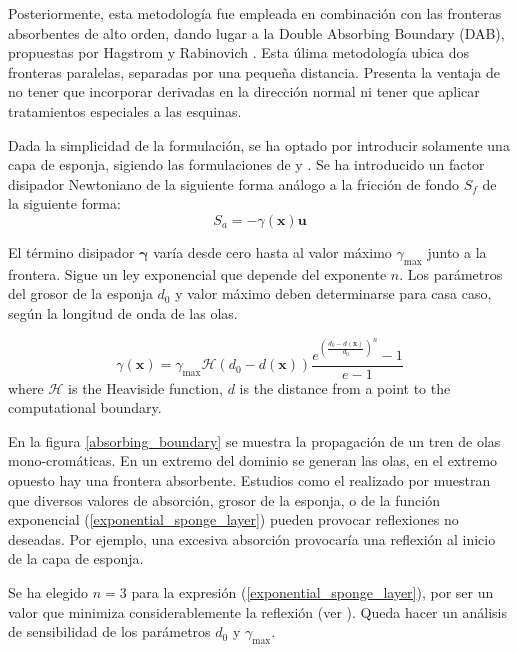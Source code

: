 Posteriormente, esta metodología fue empleada en combinación con las fronteras absorbentes de alto orden, dando lugar a la Double Absorbing Boundary (DAB), propuestas por Hagstrom y Rabinovich \cite{hagstrom2014,rabinovich2015}. Esta úlima metodología ubica dos fronteras paralelas, separadas por una pequeña distancia. Presenta la ventaja de no tener que incorporar derivadas en la dirección normal ni tener que aplicar tratamientos especiales a las esquinas.

Dada la simplicidad de la formulación, se ha optado por introducir solamente una capa de esponja, sigiendo las formulaciones de \cite{israeli1981} y \cite{carmigniani2018}. Se ha introducido un factor disipador Newtoniano de la siguiente forma análogo a la fricción de fondo $S_f$ de la siguiente forma:
\begin{equation}
    S_a = -\gamma(\mathbf{x}) \mathbf{u}
\end{equation}


El término disipador $\mathbf{\gamma}$ varía desde cero hasta al valor máximo $\gamma_{\max}$ junto a la frontera. Sigue un ley exponencial \cite{peric2018} que depende del exponente $n$. Los parámetros del grosor de la esponja $d_0$ y valor máximo deben determinarse para casa caso, según la longitud de onda de las olas.

\begin{equation} \label{exponential_sponge_layer}
    \gamma(\mathbf{x}) = \gamma_{\max} \mathcal{H}(d_0 - d(\mathbf{x})) \frac{e^{\left(\frac{d_0 - d(\mathbf{x})}{d_0}\right)^n} - 1}{e - 1}
\end{equation}
where $\mathcal{H}$ is the Heaviside function, $d$ is the distance from a point to the computational boundary.

En la figura \ref{absorbing_boundary} se muestra la propagación de un tren de olas mono-cromáticas. En un extremo del dominio se generan las olas, en el extremo opuesto hay una frontera absorbente. Estudios como el realizado por \cite{carmigniani2018} muestran que diversos valores de absorción, grosor de la esponja, o de la función exponencial (\ref{exponential_sponge_layer}) pueden provocar reflexiones no deseadas. Por ejemplo, una excesiva absorción provocaría una reflexión al inicio de la capa de esponja.

Se ha elegido $n=3$ para la expresión (\ref{exponential_sponge_layer}), por ser un valor que minimiza considerablemente la reflexión (ver \cite{carmigniani2018}). Queda hacer un análisis de sensibilidad de los parámetros $d_0$ y $\gamma_{\max}$.

